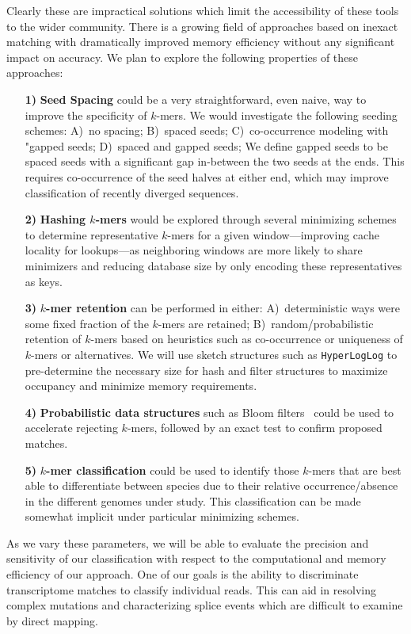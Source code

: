 \documentclass{elsarticle}
\begin{document}
Clearly these are impractical solutions which limit the accessibility
of these tools to the wider community. There is a growing field of
approaches based on inexact matching with dramatically improved memory
efficiency without any significant impact on accuracy. We plan to
explore the following properties of these approaches:
%
\begin{itemize}
%
\item[\textbf{1)}] \textbf{Seed Spacing} could be a very
straightforward, even naive, way to improve the specificity of
$k$-mers. We would investigate the following seeding schemes: A)~no
spacing; B)~spaced seeds; C)~co-occurrence modeling with "gapped
seeds; D)~spaced and gapped seeds; We define gapped seeds to be spaced
seeds with a significant gap in-between the two seeds at the ends.
This requires co-occurrence of the seed halves at either end, which
may improve classification of recently diverged sequences.
%
\item[\textbf{2)}] \textbf{Hashing $k$-mers} would be explored through
several minimizing schemes to determine representative $k$-mers for a
given window---improving cache locality for lookups---as neighboring
windows are more likely to share minimizers and reducing database size
by only encoding these representatives as keys.
%
\item[\textbf{3)}] \textbf{$k$-mer retention} can be performed in
either: A)~deterministic ways were some fixed fraction of the $k$-mers
are retained; B)~random/probabilistic retention of $k$-mers based on
heuristics such as co-occurrence or uniqueness of $k$-mers or
alternatives. We will use sketch structures such as
\texttt{HyperLogLog} to pre-determine the necessary size for hash and
filter structures to maximize occupancy and minimize memory
requirements.
%
\item[\textbf{4)}] \textbf{Probabilistic data structures} such as
Bloom filters~\citep{bloom1970acm} could be used to accelerate
rejecting $k$-mers, followed by an exact test to confirm proposed
matches.
%
\item[\textbf{5)}] \textbf{$k$-mer classification} could be used to
identify those $k$-mers that are best able to differentiate between
species due to their relative occurrence/absence in the different
genomes under study. This classification can be made somewhat implicit
under particular minimizing schemes.
%
\end{itemize}

As we vary these parameters, we will be able to evaluate the precision
and sensitivity of our classification with respect to the
computational and memory efficiency of our approach. One of our goals
is the ability to discriminate transcriptome matches to classify
individual reads. This can aid in resolving complex mutations and
characterizing splice events which are difficult to examine by direct
mapping.
\end{document}

